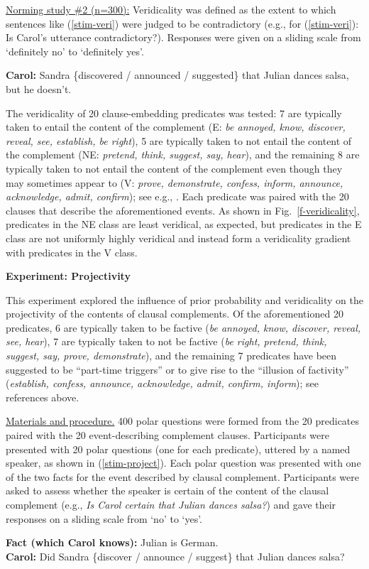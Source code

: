 \documentclass[12pt,fleqn]{article}
\newcommand{\6}{\mbox{$[\hspace*{-.6mm}[$}}
\newcommand{\9}{\mbox{$]\hspace*{-.6mm}]$}}
\begin{document}
\underline{Norming study \#2 (n=300):} Veridicality was defined as the extent to which sentences like (\ref{stim-veri}) were judged to be contradictory (e.g., for (\ref{stim-veri}): Is Carol's utterance contradictory?). Responses were given on a sliding scale from `definitely no' to `definitely yes'. 
\vspace*{-.2cm}
\begin{exe}
\ex\label{stim-veri} {\bf Carol:} Sandra \{discovered / announced / suggested\} that Julian dances salsa, but he doesn't. 
\end{exe}
\vspace*{-.2cm}
The veridicality of 20 clause-embedding predicates was tested: 7 are typically taken to entail the content of the complement (E: {\em be annoyed, know, discover, reveal, see, establish, be right}), 5 are typically taken to not entail the content of the complement (NE: {\em pretend, think, suggest, say, hear}), and the remaining 8 are typically taken to not entail the content of the complement even though they may sometimes appear to (V: {\em prove, demonstrate, confess, inform, announce, acknowledge, admit, confirm}); see e.g., \citealt{schlenker10,swanson2012,anand-hacquard2014}. Each predicate was paired with the 20 clauses that describe the aforementioned events. As shown in Fig.~\ref{f-veridicality}, predicates in the NE class are least veridical, as expected, but predicates in the E class are not uniformly highly veridical and instead form a veridicality gradient with predicates in the V class.

{\bf Experiment: Projectivity}

This experiment explored the influence of prior probability and veridicality on the projectivity of the contents of clausal complements. Of the aforementioned 20 predicates, 6 are typically taken to be factive ({\em be annoyed, know, discover, reveal, see, hear}), 7 are typically taken to not be factive ({\em be right, pretend, think, suggest, say, prove, demonstrate}), and the remaining 7 predicates have been suggested to be ``part-time triggers'' or to give rise to the ``illusion of factivity'' ({\em establish,  confess, announce, acknowledge, admit, confirm, inform}); see references above.

\underline{Materials and procedure.} 400 polar questions were formed from the 20 predicates paired with the 20 event-describing complement clauses. Participants were presented with 20 polar questions (one for each predicate), uttered by a named speaker, as shown in (\ref{stim-project}). Each polar question was presented with one of the two facts for the event described by clausal complement. Participants were asked to assess whether the speaker is certain of the content of the clausal complement (e.g., \emph{Is Carol certain that Julian dances salsa?}) and gave their responses on a sliding scale from `no' to `yes'. 
\vspace*{-.2cm}
\begin{exe}
\ex\label{stim-project} {\bf Fact (which Carol knows):} Julian is German.  \\ 
{\bf Carol:} Did Sandra \{discover / announce / suggest\} that Julian dances salsa?
\end{exe}
\vspace*{-.2cm}
\end{document}

